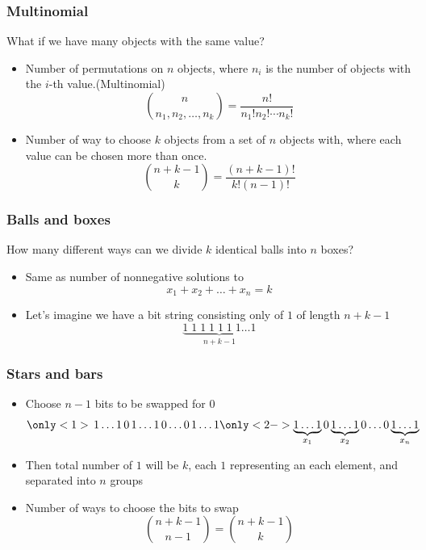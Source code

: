 \documentclass{beamer}
\begin{document}
\begin{frame}[plain]
  \vspace{20pt}
  \frametitle{Multinomial}
  What if we have many objects with the same value?
  \begin{itemize}
    \item Number of permutations on $n$ objects, where $n_i$ is the number of
      objects with the $i$-th value.(Multinomial)
      \[
        \binom{n}{n_1,n_2,\ldots,n_k} = \frac{n!}{n_1!n_2!\cdots n_k!}
      \]
    \item Number of way to choose $k$ objects from a set of $n$ objects with, where each value can be chosen more than once.
      \[
        \binom{n + k - 1}{k} = \frac{(n + k - 1)!}{k!(n-1)!}
      \]
  \end{itemize}
\end{frame}

\begin{frame}[plain]
  \frametitle{Balls and boxes}
  \vspace{30pt}
  How many different ways can we divide $k$ identical balls into $n$ boxes?
  \begin{itemize}
    \item Same as number of nonnegative solutions to
      \[
        x_1 + x_2 + \ldots + x_n = k
      \]
    \item Let's imagine we have a bit string consisting only of $1$ of length $n+k-1$
      \[
        \underbrace{1\;1\;1\;1\;1\;1\;1\ldots1}_{n+k-1}
      \]
  \end{itemize}
\end{frame}

\begin{frame}[plain]
  \frametitle{Stars and bars}
  \vspace{20pt}
  \begin{itemize}
    \item Choose $n-1$ bits to be swapped for $0$
      \[
        \only<1>{\,1\ldots1\,0\,1\ldots1\,0\ldots0\,1\ldots1}
        \only<2->{\underbrace{1\ldots1}_{x_1}0\underbrace{1\ldots1}_{x_2}0\ldots0\underbrace{1\ldots1}_{x_n}}
      \]
    \item Then total number of $1$ will be $k$, each $1$ representing an each element, and separated into $n$ groups
    \item Number of ways to choose the bits to swap
      \[
        \binom{n+k-1}{n-1} = \binom{n+k-1}{k}
      \]
  \end{itemize}
\end{frame}
\end{document}

